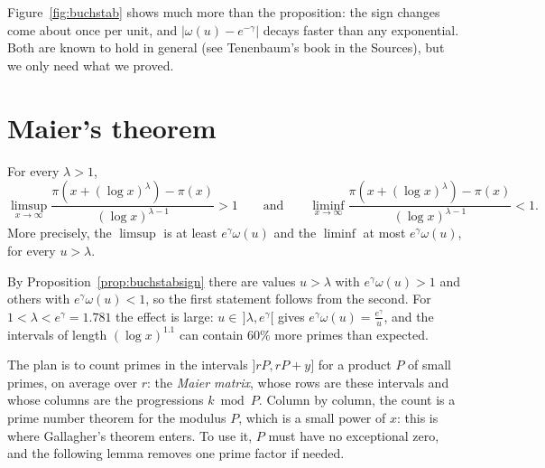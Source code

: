Figure~\ref{fig:buchstab} shows much more than the proposition: the sign changes come about once per unit, and $|\omega(u)-e^{-\gamma}|$ decays faster than any exponential. Both are known to hold in general (see Tenenbaum's book in the Sources), but we only need what we proved.

\section{Maier's theorem}

\begin{theorem}[Maier, 1985]\label{thm:maier}
For every $\lambda>1$,
\[
\limsup_{x\to\infty}\frac{\pi(x+(\log x)^\lambda)-\pi(x)}{(\log x)^{\lambda-1}}>1\qquad\text{and}\qquad\liminf_{x\to\infty}\frac{\pi(x+(\log x)^\lambda)-\pi(x)}{(\log x)^{\lambda-1}}<1.
\]
More precisely, the $\limsup$ is at least $e^\gamma\omega(u)$ and the $\liminf$ at most $e^\gamma\omega(u)$, for every $u>\lambda$.
\end{theorem}

By Proposition~\ref{prop:buchstabsign} there are values $u>\lambda$ with $e^\gamma\omega(u)>1$ and others with $e^\gamma\omega(u)<1$, so the first statement follows from the second. For $1<\lambda<e^\gamma=1.781$ the effect is large: $u\in\,]\lambda,e^\gamma[$ gives $e^\gamma\omega(u)=\frac{e^\gamma}u$, and the intervals of length $(\log x)^{1.1}$ can contain $60\%$ more primes than expected.

The plan is to count primes in the intervals $]rP,rP+y]$ for a product $P$ of small primes, on average over $r$: the \emph{Maier matrix}, whose rows are these intervals and whose columns are the progressions $k\bmod P$. Column by column, the count is a prime number theorem for the modulus $P$, which is a small power of $x$: this is where Gallagher's theorem enters. To use it, $P$ must have no exceptional zero, and the following lemma removes one prime factor if needed.


